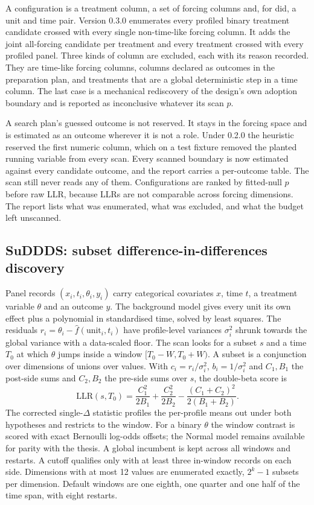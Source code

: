 \documentclass[11pt]{article}
\begin{document}
A configuration is a treatment column, a set of forcing columns and, for did, a unit and
time pair. Version 0.3.0 enumerates every profiled binary treatment candidate crossed with every
single non-time-like forcing column. It adds the joint all-forcing candidate per treatment
and every treatment crossed with every profiled panel. Three kinds of column are excluded,
each with its reason recorded. They are time-like forcing columns, columns declared as
outcomes in the preparation plan, and treatments that are a global deterministic step in a
time column. The last case is a mechanical rediscovery of the design's own adoption
boundary and is reported as inconclusive whatever its scan $p$.

A search plan's guessed outcome is not reserved. It stays in the forcing space and is
estimated as an outcome wherever it is not a role. Under 0.2.0 the heuristic reserved the
first numeric column, which on a test fixture removed the planted running variable from
every scan. Every scanned boundary is now estimated against every candidate outcome,
and the report carries a per-outcome table. The scan still never reads any of them.
Configurations are ranked by fitted-null $p$ before raw LLR, because LLRs are not
comparable across forcing dimensions. The report lists what was enumerated, what was
excluded, and what the budget left unscanned.

\subsection{SuDDDS: subset difference-in-differences discovery}\label{sec:suddds}

Panel records $(x_i, t_i, \theta_i, y_i)$ carry categorical covariates $x$, time $t$,
a treatment variable $\theta$ and an outcome $y$. The background model gives every unit
its own effect plus a polynomial in standardised time, solved by least squares. The
residuals $r_i = \theta_i - \hat f(\text{unit}_i, t_i)$ have profile-level variances
$\sigma_i^2$ shrunk towards the global variance with a data-scaled floor. The scan looks for a subset $s$ and a time $T_0$ at which $\theta$ jumps inside a window
$[T_0 - W, T_0 + W)$. A subset is a conjunction over dimensions of unions over values. With
$c_i = r_i/\sigma_i^2$, $b_i = 1/\sigma_i^2$ and $C_1, B_1$ the post-side sums and
$C_2, B_2$ the pre-side sums over $s$, the double-beta score is
\begin{equation}
\mathrm{LLR}(s, T_0) = \frac{C_1^2}{2B_1} + \frac{C_2^2}{2B_2}
  - \frac{(C_1 + C_2)^2}{2(B_1 + B_2)}.
\end{equation}
The corrected single-$\Delta$ statistic profiles the per-profile means out under both
hypotheses and restricts to the window. For a binary $\theta$ the window contrast is
scored with exact Bernoulli log-odds offsets; the Normal model remains available for
parity with the thesis. A global incumbent is kept across all windows and restarts.
A cutoff qualifies only with at least three in-window records on each side. Dimensions
with at most 12 values are enumerated exactly, $2^{k}-1$ subsets per dimension. Default
windows are one eighth, one quarter and one half of the time span, with eight restarts.
\end{document}
